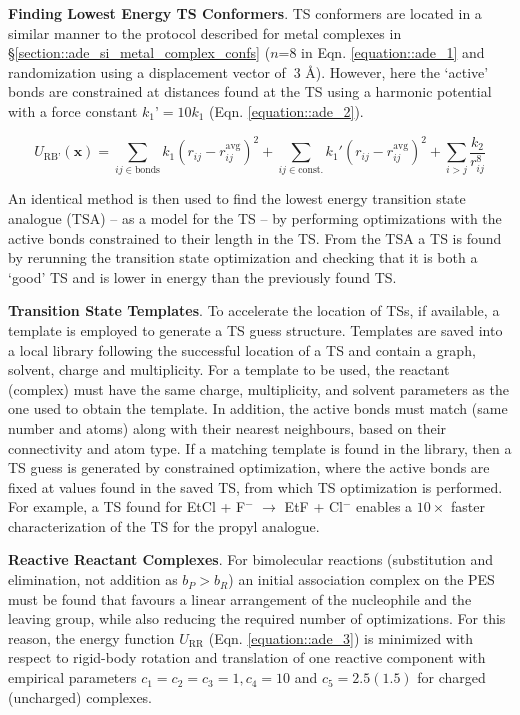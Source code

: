\documentclass[../../main.tex]{subfiles}
\begin{document}
{\textbf{Finding Lowest Energy TS Conformers}}. TS conformers are located in a similar manner to the protocol described for metal complexes in §\ref{section::ade_si_metal_complex_confs} ($n$=8 in Eqn. \eqref{equation::ade_1} and randomization using a displacement vector of $~ 3$ \AA). However, here the ‘active’ bonds are constrained at distances found at the TS using a harmonic potential with a force constant $k_1’ = 10k_1$ (Eqn. \eqref{equation::ade_2}).


\begin{equation}
	U_\text{RB'}(\boldsymbol{x}) = \sum_{ij \in \text{bonds}} k_1 (r_{ij} - r_{ij}^\text{avg})^2 + \sum_{ij \in \text{const.}} k_1' (r_{ij} - r_{ij}^\text{avg})^2 + \sum_{i > j} \frac{k_2}{r_{ij}^8}
	\label{equation::ade_2}
\end{equation}

An identical method is then used to find the lowest energy transition state analogue (TSA) -- as a model for the TS -- by performing optimizations with the active bonds constrained to their length in the TS. From the TSA a TS is found by rerunning the transition state optimization and checking that it is both a ‘good’ TS and is lower in energy than the previously found TS.


{\bfseries{Transition State Templates}}. To accelerate the location of TSs, if available, a template is employed to generate a TS guess structure. Templates are saved into a local library following the successful location of a TS and contain a graph, solvent, charge and multiplicity. For a template to be used, the reactant (complex) must have the same charge, multiplicity, and solvent parameters as the one used to obtain the template. In addition, the active bonds must match (same number and atoms) along with their nearest neighbours, based on their connectivity and atom type. If a matching template is found in the library, then a TS guess is generated by constrained optimization, where the active bonds are fixed at values found in the saved TS, from which TS optimization is performed. For example, a TS found for EtCl + F$^{-}$ $\rightarrow$ EtF + Cl$^{-}$ enables a $10\times$ faster characterization of the TS for the propyl analogue. 


{\bfseries{Reactive Reactant Complexes}}. For bimolecular reactions (substitution and elimination, not addition as $b_P > b_R$) an initial association complex on the PES must be found that favours a linear arrangement of the nucleophile and the leaving group, while also reducing the required number of optimizations. For this reason, the energy function $U_\text{RR}$ (Eqn. \eqref{equation::ade_3}) is minimized with respect to rigid-body rotation and translation of one reactive component with empirical parameters $c_1 = c_2 = c_3 = 1, c_4 = 10$ and $c_5 = 2.5 (1.5)$ for charged (uncharged) complexes. 
\end{document}
